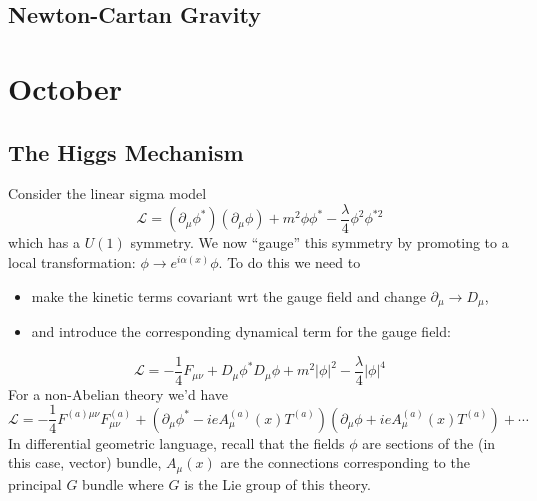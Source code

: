 \documentclass{report}
\begin{document}
\section{Newton-Cartan Gravity}

\chapter{October}
\begin{tocbox}
	\minitoc
\end{tocbox}

\section{The Higgs Mechanism}
 Consider the linear sigma model 
\begin{equation*}
	\mathcal{L} = (\partial_\mu \phi^\ast)(\partial_\mu \phi)
			+ m^2 \phi\phi^\ast - \frac{\lambda}{4} \phi^2 \phi^{\ast 2}
\end{equation*}
which has a $ U(1) $ symmetry. We now ``gauge'' this symmetry by promoting 
to a local transformation: $ \phi \rightarrow e^{i\alpha(x)} \phi$. To do this 
we need to 
\begin{itemize}[noitemsep,topsep=0pt]
\item make the kinetic terms covariant wrt the gauge field and change 
	$ \partial_\mu \rightarrow D_\mu $, 
\item and introduce the corresponding dynamical 
	term for the gauge field:
\end{itemize}
\begin{equation*}
	\mathcal{L} = -\frac{1}{4}F_{\mu\nu}
		+ D_\mu \phi^\ast D_\mu\phi + m^2 |\phi|^2 - \frac{\lambda}{4}|\phi|^4
\end{equation*}
For a non-Abelian theory we'd have 
\begin{equation*}
	\mathcal{L} = -\frac{1}{4}F^{(a)\mu\nu}F_{\mu\nu}^{(a)}
		+ (\partial_\mu \phi^\ast - ieA^{(a)}_\mu(x) T^{(a)})
		  (\partial_\mu \phi + ieA^{(a)}_\mu(x) T^{(a)}) + \cdots 
\end{equation*}
In differential geometric language, recall that the fields $ \phi $ are 
sections of the (in this case, vector) bundle, $ A_\mu(x) $ are the connections 
corresponding to the principal $ G $ bundle where $ G $ is the Lie group of this 
theory.
\end{document}
